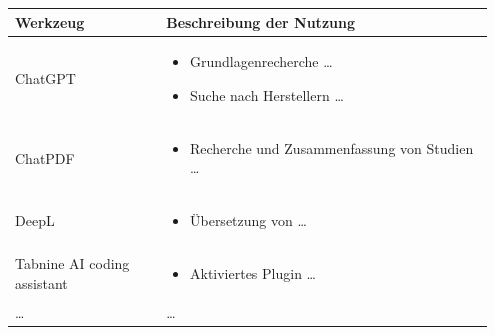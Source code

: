 \documentclass[openany]{scrbook} %
\begin{document}
\begin{table}[hbt]
    \centering
    \renewcommand{\arraystretch}{1.5}
    \label{tab:anhang_uebersicht_KI_werkzeuge}
    \begin{tabular}{>{\raggedright\arraybackslash}p{0.3\linewidth}
                    >{\raggedright\arraybackslash}p{0.65\linewidth}}
        \textbf{Werkzeug} & \textbf{Beschreibung der Nutzung}\\
        \hline \hline
        ChatGPT &
        \begin{itemize}[noitemsep,topsep=0pt]
            \item Grundlagenrecherche …
            \item Suche nach Herstellern …
        \end{itemize} \\
        ChatPDF &
        \begin{itemize}[noitemsep,topsep=0pt]
            \item Recherche und Zusammenfassung von Studien …
        \end{itemize} \\
        DeepL &
        \begin{itemize}[noitemsep,topsep=0pt]
            \item Übersetzung von …
        \end{itemize} \\
        Tabnine AI coding assistant &
        \begin{itemize}[noitemsep,topsep=0pt]
            \item Aktiviertes Plugin …
        \end{itemize} \\
        \ldots & \ldots \\
        \hline
    \end{tabular}
\end{table}







\begingroup
\renewcommand{\bibfont}{\fontsize{13pt}{12pt}\selectfont}  %
\sloppy
\printbibliography
\endgroup
\end{document}
